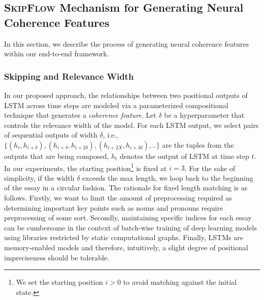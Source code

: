 \documentclass[letterpaper]{article}
\begin{document}
\subsection{\textsc{SkipFlow} Mechanism for Generating Neural Coherence Features}
In this section, we describe the process of generating neural coherence features within our end-to-end framework. 
\subsubsection{Skipping and Relevance Width}
In our proposed approach, the relationships between two positional outputs of LSTM across time steps are modeled via a parameterized compositional technique that generates a \textit{coherence feature}. Let $\delta$ be a hyperparameter that controls the relevance width of the model. For each LSTM output, we select pairs of sequential outputs of width $\delta$, i.e., $\{ (h_i,h_{i+\delta}),(h_{i+\delta},h_{i+2\delta}),(h_{i+2X},h_{i+3\delta}),..\}$ are the tuples from the outputs that are being composed, $h_t$ denotes the output of LSTM at time step $t$. In our experiments, the starting position\footnote{We set the starting position $i>0$ to avoid matching against the initial state.} is fixed at $i=3$. For the sake of simplicity, if the width $\delta$ exceeds the max length, we loop back to the beginning of the essay in a circular fashion. The rationale for fixed length matching is as follows. Firstly, we want to limit the amount of preprocessing required as determining important key points such as nouns and pronouns require preprocessing of some sort. Secondly, maintaining specific indices for each essay can be cumbersome in the context of batch-wise training of deep learning models using libraries restricted by static computational graphs. Finally, LSTMs are memory-enabled models and therefore, intuitively, a slight degree of positional impreciseness should be tolerable. 
\end{document}
